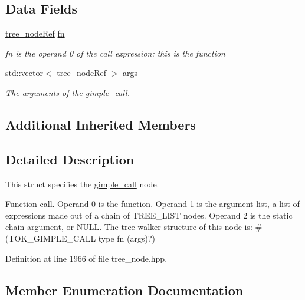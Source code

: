 \subsection*{Data Fields}
\begin{DoxyCompactItemize}
\item 
\hyperlink{tree__node_8hpp_a6ee377554d1c4871ad66a337eaa67fd5}{tree\+\_\+node\+Ref} \hyperlink{structgimple__call_ac6e5fe41e34c091bdcecdf74e0724b93}{fn}
\begin{DoxyCompactList}\small\item\em fn is the operand 0 of the call expression\+: this is the function \end{DoxyCompactList}\item 
std\+::vector$<$ \hyperlink{tree__node_8hpp_a6ee377554d1c4871ad66a337eaa67fd5}{tree\+\_\+node\+Ref} $>$ \hyperlink{structgimple__call_a43dc4a5085f0b928b92f1d3b2bd529a2}{args}
\begin{DoxyCompactList}\small\item\em The arguments of the \hyperlink{structgimple__call}{gimple\+\_\+call}. \end{DoxyCompactList}\end{DoxyCompactItemize}
\subsection*{Additional Inherited Members}


\subsection{Detailed Description}
This struct specifies the \hyperlink{structgimple__call}{gimple\+\_\+call} node. 

Function call. Operand 0 is the function. Operand 1 is the argument list, a list of expressions made out of a chain of T\+R\+E\+E\+\_\+\+L\+I\+ST nodes. Operand 2 is the static chain argument, or N\+U\+LL. The tree walker structure of this node is\+: \#(T\+O\+K\+\_\+\+G\+I\+M\+P\+L\+E\+\_\+\+C\+A\+LL type fn (args)?) 

Definition at line 1966 of file tree\+\_\+node.\+hpp.



\subsection{Member Enumeration Documentation}
\mbox{\label{structgimple__call_afe165231f256bdae084f2c0a60bb0bde}} 

